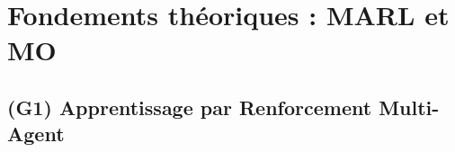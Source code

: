

\section{Fondements théoriques : MARL et MO}



\subsection{(G1) Apprentissage par Renforcement Multi-Agent}

